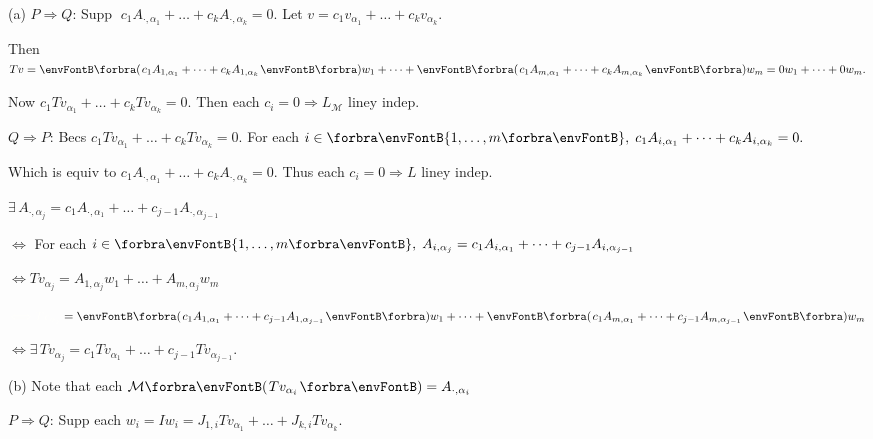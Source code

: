 (a) $P\Rightarrow Q:$\,\;Supp $\;c_1A_{\cdot,{\alpha_1}}+\dots+c_kA_{\cdot,{\alpha_k}}=0.$ \;Let $v=c_1v_{\alpha_1}+\dots+c_kv_{\alpha_k}.$\par\quad\Ha
{}Then $Tv=\BigPar{c_1A_{1,{\alpha_1}}+\dots+c_kA_{1,{\alpha_k}}}w_1+\dots+\BigPar{c_1A_{m,{\alpha_1}}+\dots+c_kA_{m,{\alpha_k}}}w_m=0w_1+\dots+0w_m.$\par\quad\Ha
{}Now $c_1Tv_{\alpha_1}+\dots+c_kTv_{\alpha_k}=0.$ Then each $c_i=0\Rightarrow L_{\mathcal{M}}$ liney indep.\vspace{4pt}\par\quad\Ha
$Q\Rightarrow P:$\,\;Becs $c_1Tv_{\alpha_1}+\dots+c_kTv_{\alpha_k}=0.$ For each $i\in\Bra{1,\dots,m},\;c_1A_{i,{\alpha_1}}+\dots+c_kA_{i,{\alpha_k}}=0.$\par\quad\Ha
{}Which is equiv to $c_1A_{\cdot,{\alpha_1}}+\dots+c_kA_{\cdot,{\alpha_k}}=0.$ \;Thus each $c_i=0\Rightarrow L$ liney indep.\par\vspace{4pt}\quad\Ha
\Or\;$\exists\,A_{\cdot,{\alpha_j}}=c_1A_{\cdot,{\alpha_1}}+\dots+c_{j-1}A_{\cdot,{\alpha_{j-1}}}$\par\quad\Ha
\Blind{\Or\;}$\Longleftrightarrow$ For each $i\in\Bra{1,\dots,m},\;A_{i,{\alpha_j}}=c_1A_{i,{\alpha_1}}+\dots+c_{j-1}A_{i,{\alpha_{j-1}}}$\par\quad\Ha
\Blind{\Or\;}$\Longleftrightarrow Tv_{\alpha_j}=A_{1,{\alpha_j}}w_1+\dots+A_{m,{\alpha_j}}w_m$\par\vspace{2pt}\quad\Ha
\Blind{\Or\;}$\Blind{\Longleftrightarrow Tv_{\alpha_j}}=\BigPar{c_1A_{1,{\alpha_1}}+\dots+c_{j-1}A_{1,{\alpha_{j-1}}}}w_1+\dots+\BigPar{c_1A_{m,{\alpha_1}}+\dots+c_{j-1}A_{m,{\alpha_{j-1}}}}w_m$\par\vspace{2pt}\quad\Ha
\Blind{\Or\;}$\Longleftrightarrow\exists\,Tv_{\alpha_j}=c_1Tv_{\alpha_1}+\dots+c_{j-1}Tv_{\alpha_{j-1}}.$\par\vspace{6pt}\quad
(b) Note that each $\Mt{Tv_{\alpha_i}}=A_{\cdot,\alpha_i}$\par\quad\Hb
$P\Rightarrow Q:$\,\;Supp each $w_i=Iw_i=J_{1,i}Tv_{\alpha_1}+\dots+J_{k,i}Tv_{\alpha_k}.$\par\quad\Hb
